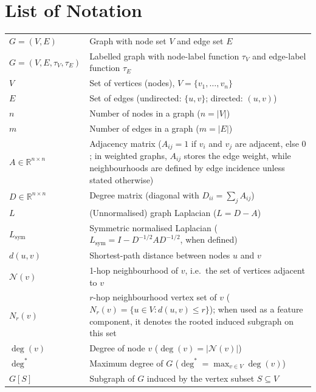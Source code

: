 \cleardoublepage
\chapter*{List of Notation}

\small
\setlength{\tabcolsep}{3pt}
\renewcommand{\arraystretch}{1.00}
\setlength{\extrarowheight}{0pt}


\newcommand{\notsec}[1]{%
  \addlinespace[0.35em]
  \multicolumn{2}{@{}l@{}}{\textbf{#1}}\\[-0.2em]
  \midrule
}

\begin{tabularx}{\textwidth}{@{}L X@{}}
\toprule

\notsec{Graphs and matrices}
$G=(V,E)$ & Graph with node set $V$ and edge set $E$ \\
$G=(V,E,\tau_V,\tau_E)$ & Labelled graph with node-label function \(\tau_V\) and edge-label function \(\tau_E\) \\
$V$ & Set of vertices (nodes), $V=\{v_1,\dots,v_n\}$ \\
$E$ & Set of edges (undirected: $\{u,v\}$; directed: $(u,v)$) \\
$n$ & Number of nodes in a graph ($n=|V|$) \\
$m$ & Number of edges in a graph ($m=|E|$) \\
$A \in \mathbb{R}^{n\times n}$ & Adjacency matrix ($A_{ij}=1$ if \(v_i\) and \(v_j\) are adjacent, else $0$; in weighted graphs, $A_{ij}$ stores the edge weight, while neighbourhoods are defined by edge incidence unless stated otherwise) \\
$D \in \mathbb{R}^{n\times n}$ & Degree matrix (diagonal with $D_{ii}=\sum_j A_{ij}$) \\
$L$ & (Unnormalised) graph Laplacian ($L=D-A$) \\
$L_{\mathrm{sym}}$ & Symmetric normalised Laplacian ($L_{\mathrm{sym}}=I-D^{-1/2}AD^{-1/2}$, when defined) \\
$d(u,v)$ & Shortest-path distance between nodes $u$ and $v$ \\
$\mathcal{N}(v)$ & 1-hop neighbourhood of $v$, i.e.\ the set of vertices adjacent to \(v\) \\
$N_r(v)$ & $r$-hop neighbourhood vertex set of $v$ ($N_r(v)=\{u\in V:d(u,v)\le r\}$); when used as a feature component, it denotes the rooted induced subgraph on this set \\
$\deg(v)$ & Degree of node $v$ ($\deg(v)=|\mathcal{N}(v)|$) \\
$\deg^*$ & Maximum degree of $G$ ($\deg^*=\max_{v\in V}\deg(v)$) \\
$G[S]$ & Subgraph of $G$ induced by the vertex subset $S\subseteq V$ \\


\end{tabularx}
